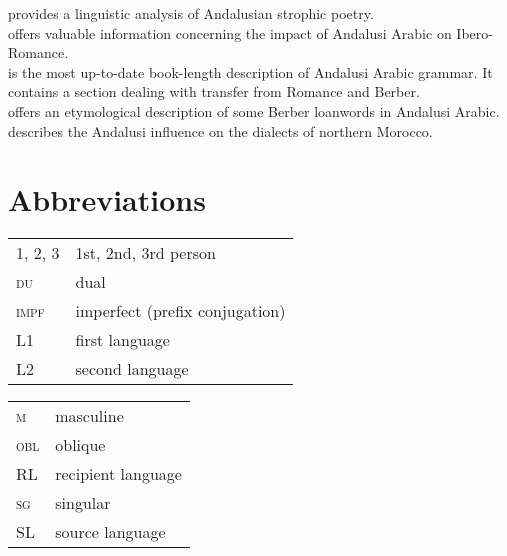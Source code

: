 \documentclass[output=paper,modfonts,nonflat]{langsci/langscibook}
\begin{document}
\citet{Corriente1997poetry} provides a linguistic analysis of Andalusian strophic poetry.\\
\citet{Corriente2005} offers valuable information concerning the impact of Andalusi Arabic on Ibero-Romance.\\
\citet{CorrientePereiraVicente2015} is the most up-to-date book-length description of Andalusi Arabic grammar. It contains a section dealing with transfer from Romance and Berber.\\ 
\citet{Ferrando1997} offers an etymological description of some Berber loanwords in Andalusi Arabic.\\ 
\citet{Vicente2010} describes the Andalusi influence on the dialects of northern Morocco. 

\section*{Abbreviations}

\begin{tabularx}{.5\textwidth}{@{}lQ@{}}
\textsc{1, 2, 3} & 1st, 2nd, 3rd person \\
\textsc{du} & dual \\
\textsc{impf} & imperfect (prefix conjugation) \\
L1 & first language \\
L2 & second language \\
\end{tabularx}%
\begin{tabularx}{.5\textwidth}{@{}lQ@{}}
\textsc{m} & masculine \\
\textsc{obl} & oblique \\
RL & recipient language \\
\textsc{sg} & singular \\
SL & source language \\
\end{tabularx}
 
\sloppy\printbibliography[heading=subbibliography,notkeyword=this]
\end{document}
